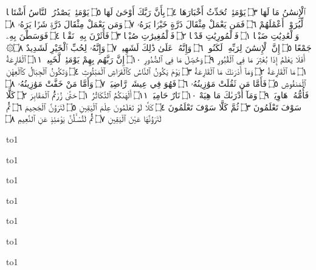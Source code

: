 ٱلْإِنسَٰنُ مَا لَهَا ۝٣ يَوْمَئِذࣲ تُحَدِّثُ أَخْبَارَهَا ۝٤ بِأَنَّ رَبَّكَ أَوْحَىٰ لَهَا ۝٥
يَوْمَئِذࣲ يَصْدُرُ ٱلنَّاسُ أَشْتَاتࣰا لِّيُرَوْا۟ أَعْمَٰلَهُمْ ۝٦ فَمَن يَعْمَلْ
مِثْقَالَ ذَرَّةٍ خَيْرࣰا يَرَهُۥ ۝٧ وَمَن يَعْمَلْ مِثْقَالَ ذَرَّةࣲ شَرࣰّا يَرَهُۥ ۝٨
وَٱلْعَٰدِيَٰتِ ضَبْحࣰا ۝١ فَٱلْمُورِيَٰتِ قَدْحࣰا ۝٢ فَٱلْمُغِيرَٰتِ
صُبْحࣰا ۝٣ فَأَثَرْنَ بِهِۦ نَقْعࣰا ۝٤ فَوَسَطْنَ بِهِۦ جَمْعًا ۝٥
إِنَّ ٱلْإِنسَٰنَ لِرَبِّهِۦ لَكَنُودࣱ ۝٦ وَإِنَّهُۥ عَلَىٰ ذَٰلِكَ لَشَهِيدࣱ ۝٧ وَإِنَّهُۥ لِحُبِّ
ٱلْخَيْرِ لَشَدِيدٌ ۝٨۞ أَفَلَا يَعْلَمُ إِذَا بُعْثِرَ مَا فِي ٱلْقُبُورِ ۝٩
وَحُصِّلَ مَا فِي ٱلصُّدُورِ ۝١٠ إِنَّ رَبَّهُم بِهِمْ يَوْمَئِذࣲ لَّخَبِيرُۢ ۝١١
ٱلْقَارِعَةُ ۝١ مَا ٱلْقَارِعَةُ ۝٢ وَمَآ أَدْرَىٰكَ مَا ٱلْقَارِعَةُ ۝٣ يَوْمَ
يَكُونُ ٱلنَّاسُ كَٱلْفَرَاشِ ٱلْمَبْثُوثِ ۝٤ وَتَكُونُ ٱلْجِبَالُ كَٱلْعِهْنِ
ٱلْمَنفُوشِ ۝٥ فَأَمَّا مَن ثَقُلَتْ مَوَٰزِينُهُۥ ۝٦ فَهُوَ فِي عِيشَةࣲ
رَّاضِيَةࣲ ۝٧ وَأَمَّا مَنْ خَفَّتْ مَوَٰزِينُهُۥ ۝٨ فَأُمُّهُۥ هَاوِيَةࣱ ۝٩
وَمَآ أَدْرَىٰكَ مَا هِيَهْ ۝١٠ نَارٌ حَامِيَةُۢ ۝١١
أَلْهَىٰكُمُ ٱلتَّكَاثُرُ ۝١ حَتَّىٰ زُرْتُمُ ٱلْمَقَابِرَ ۝٢ كَلَّا سَوْفَ تَعْلَمُونَ ۝٣ ثُمَّ
كَلَّا سَوْفَ تَعْلَمُونَ ۝٤ كَلَّا لَوْ تَعْلَمُونَ عِلْمَ ٱلْيَقِينِ ۝٥ لَتَرَوُنَّ ٱلْجَحِيمَ ۝٦
ثُمَّ لَتَرَوُنَّهَا عَيْنَ ٱلْيَقِينِ ۝٧ ثُمَّ لَتُسْـَٔلُنَّ يَوْمَئِذٍ عَنِ ٱلنَّعِيمِ ۝٨
\newpage
{}
\centerline{\hbox to1\textwidth{وَٱلْعَصْرِ ۝١ إِنَّ ٱلْإِنسَٰنَ لَفِي خُسْرٍ ۝٢ إِلَّا ٱلَّذِينَ ءَامَنُوا۟}}
\centerline{\hbox to1\textwidth{وَعَمِلُوا۟ ٱلصَّٰلِحَٰتِ وَتَوَاصَوْا۟ بِٱلْحَقِّ وَتَوَاصَوْا۟ بِٱلصَّبْرِ ۝٣}}
\centerline{\hbox to1\textwidth{وَيْلࣱ لِّكُلِّ هُمَزَةࣲ لُّمَزَةٍ ۝١ ٱلَّذِي جَمَعَ مَالࣰا وَعَدَّدَهُۥ ۝٢}}
\centerline{\hbox to1\textwidth{يَحْسَبُ أَنَّ مَالَهُۥٓ أَخْلَدَهُۥ ۝٣ كَلَّاۖ لَيُنۢبَذَنَّ فِي ٱلْحُطَمَةِ ۝٤}}
\centerline{\hbox to1\textwidth{وَمَآ أَدْرَىٰكَ مَا ٱلْحُطَمَةُ ۝٥ نَارُ ٱللَّهِ ٱلْمُوقَدَةُ ۝٦ ٱلَّتِي تَطَّلِعُ}}
\centerline{\hbox to1\textwidth{عَلَى ٱلْأَفْـِٔدَةِ ۝٧ إِنَّهَا عَلَيْهِم مُّؤْصَدَةࣱ ۝٨ فِي عَمَدࣲ مُّمَدَّدَةِۭ ۝٩}}
\centerline{\hbox to1\textwidth{أَلَمْ تَرَ كَيْفَ فَعَلَ رَبُّكَ بِأَصْحَٰبِ ٱلْفِيلِ ۝١ أَلَمْ يَجْعَلْ}}
